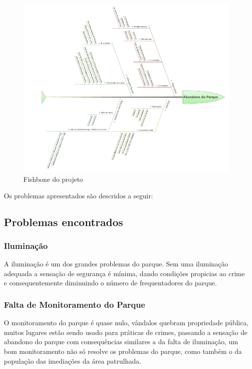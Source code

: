 \begin{figure}[!h]
	\centering
	\label{FISHBONE}
		\includegraphics[keepaspectratio=true,scale=0.6]{figuras/FISHBONE_complete.png}
	\caption{Fishbone do projeto}
\end{figure}

Os problemas apresentados s\~ao descridos a seguir:

\subsection{Problemas encontrados}
\subsubsection{Ilumina\c{c}\~ao}

A ilumina\c{c}\~ao \'e um dos grandes problemas do parque. Sem uma ilumina\c{c}\~ao adequada a sensa\c{c}\~ao de seguran\c{c}a \'e m\'inima, dando condi\c{c}\~oes propicias ao crime e consequentemente diminuindo o n\'umero de frequentadores do parque.

\subsubsection{Falta de Monitoramento do Parque}

O monitoramento do parque \'e quase nulo, v\^andalos quebram propriedade p\'ublica, muitos lugares est\~ao sendo usado para pr\'aticas de crimes, passando a sensa\c{c}\~ao de abandono do parque com consequ\^encias similares a da falta de ilumina\c{c}\~ao, um bom monitoramento n\~ao s\'o resolve os problemas do parque, como tamb\'em o da popula\c{c}\~ao das imedia\c{c}\~oes da \'area patrulhada.

